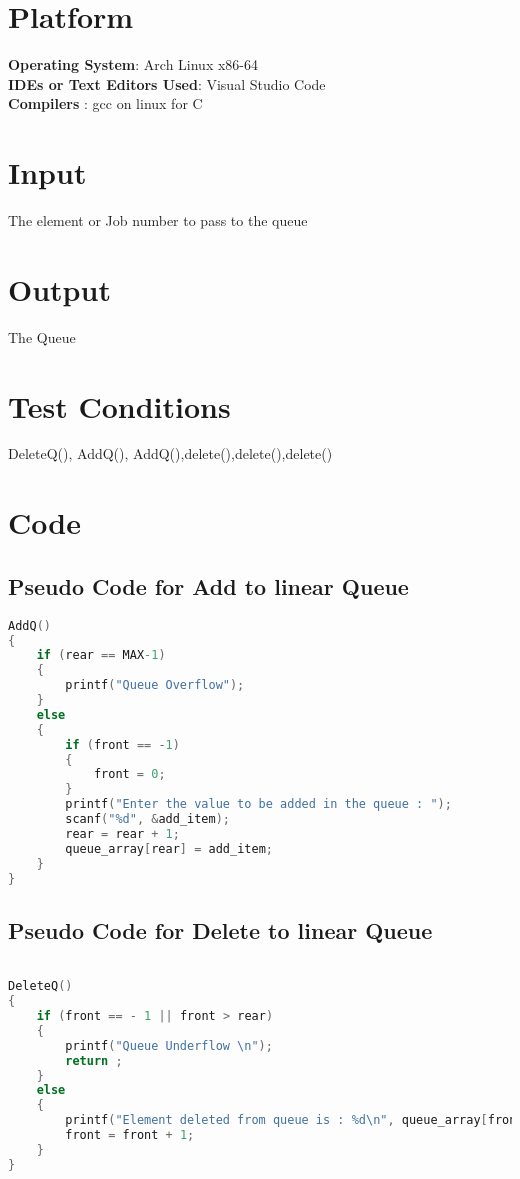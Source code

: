 \documentclass[11pt]{article}
\begin{document}
\section{Platform}
\textbf{Operating System}: Arch Linux x86-64 \\
\textbf{IDEs or Text Editors Used}: Visual Studio Code\\
\textbf{Compilers} : gcc on linux for C\\

\section{Input}
The element or Job number to pass to the queue
\section{Output}
The Queue
\section{Test Conditions}
DeleteQ(), AddQ(), AddQ(),delete(),delete(),delete()
\section{Code}
\subsection{Pseudo Code for Add to linear Queue}
\begin{lstlisting}[language=C]
AddQ()
{
	if (rear == MAX-1)
	{
		printf("Queue Overflow");
	}
	else
	{
		if (front == -1)
		{
			front = 0;
		}
		printf("Enter the value to be added in the queue : ");
		scanf("%d", &add_item);
		rear = rear + 1;
		queue_array[rear] = add_item;
	}
}

\end{lstlisting}


\subsection{Pseudo Code for Delete to linear Queue}

\begin{lstlisting}[language=C]

DeleteQ()
{
	if (front == - 1 || front > rear)
	{
		printf("Queue Underflow \n");
		return ;
	}
	else
	{
		printf("Element deleted from queue is : %d\n", queue_array[front]);
		front = front + 1;
	}
}


\end{lstlisting}
\end{document}

